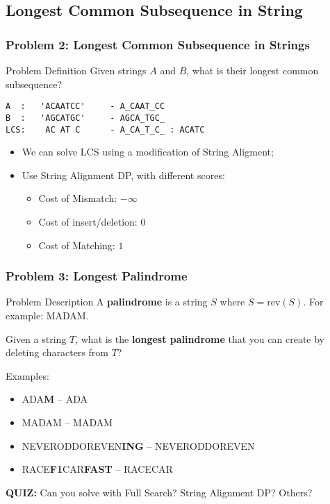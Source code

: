 \subsection{Longest Common Subsequence in String}

\begin{frame}[fragile]
  \frametitle{Problem 2: Longest Common Subsequence in Strings}
    \begin{block}{Problem Definition}
      Given strings $A$ and $B$, what is their longest common subsequence?\medskip

\begin{verbatim}
A  :   'ACAATCC'     - A_CAAT_CC
B  :   'AGCATGC'     - AGCA_TGC_
LCS:    AC AT C      - A_CA_T_C_ : ACATC
\end{verbatim}
    \end{block}\bigskip

  \begin{itemize}
    \item We can solve LCS using a modification of String Aligment;
    \item Use String Alignment DP, with different scores:
    \begin{itemize}
      \item Cost of Mismatch: $-\infty$
      \item Cost of insert/deletion: $0$
      \item Cost of Matching: $1$
    \end{itemize}
  \end{itemize}
\end{frame}

\begin{frame}
  \frametitle{Problem 3: Longest Palindrome}
    \begin{block}{Problem Description}
      A {\bf palindrome} is a string $S$ where $S = \text{rev}(S)$. For example: MADAM.\bigskip

      Given a string $T$, what is the {\bf longest palindrome} that you can create by deleting characters from $T$?
    \end{block}

    Examples:
    \begin{itemize}
    \item ADA\alert{\bf M} -- ADA
    \item MADAM -- MADAM
    \item NEVERODDOREVEN\alert{\bf ING} -- NEVERODDOREVEN
    \item RACE\alert{\bf F1}CAR\alert{\bf FAST} -- RACECAR
    \end{itemize}\bigskip

    {\bf QUIZ:} Can you solve with Full Search? String Alignment DP? Others?
  \end{frame}

